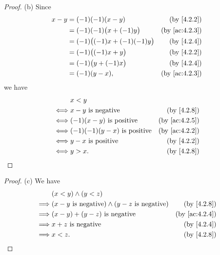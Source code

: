 \begin{proof}{(b)}
  Since
  \begin{align*}
    x - y & = (-1)(-1)(x - y)                 & \text{(by \cref{4.2.2})}    \\
          & = (-1)(-1)\big(x + (-1)y\big)     & \text{(by \cref{ac:4.2.3})} \\
          & = (-1)\big((-1)x + (-1)(-1)y\big) & \text{(by \cref{4.2.4})}    \\
          & = (-1)\big((-1)x + y\big)         & \text{(by \cref{4.2.2})}    \\
          & = (-1)\big(y + (-1)x\big)         & \text{(by \cref{4.2.4})}    \\
          & = (-1)(y - x),                    & \text{(by \cref{ac:4.2.3})}
  \end{align*}
  we have
  \begin{align*}
         & x < y                                                             \\
    \iff & x - y \text{ is negative}           & \text{(by \cref{4.2.8})}    \\
    \iff & (-1)(x - y) \text{ is positive}     & \text{(by \cref{ac:4.2.5})} \\
    \iff & (-1)(-1)(y - x) \text{ is positive} & \text{(by \cref{ac:4.2.2})} \\
    \iff & y - x \text{ is positive}           & \text{(by \cref{4.2.2})}    \\
    \iff & y > x.                              & \text{(by \cref{4.2.8})}
  \end{align*}
\end{proof}

\begin{proof}{(c)}
  We have
  \begin{align*}
             & (x < y) \land (y < z)                                                                       \\
    \implies & (x - y \text{ is negative}) \land (y - z \text{ is negative}) & \text{(by \cref{4.2.8})}    \\
    \implies & (x - y) + (y - z) \text{ is negative}                         & \text{(by \cref{ac:4.2.4})} \\
    \implies & x + z \text{ is negative}                                     & \text{(by \cref{4.2.4})}    \\
    \implies & x < z.                                                        & \text{(by \cref{4.2.8})}
  \end{align*}
\end{proof}

